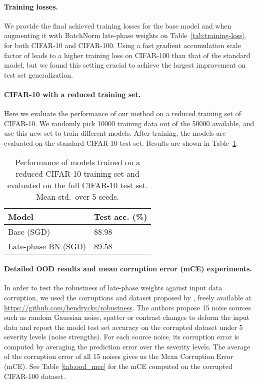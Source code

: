 \documentclass{article} \usepackage{iclr2021_conference,times}
\begin{document}
\paragraph{Training losses.} We provide the final achieved training losses for the base model and when augmenting it with BatchNorm late-phase weights on Table~\ref{tab:training-loss}, for both CIFAR-10 and CIFAR-100. Using a fast gradient accumulation scale factor of  leads to a higher training loss on CIFAR-100 than that of the standard model, but we found this setting crucial to achieve the largest improvement on test set generalization.



\paragraph{CIFAR-10 with a reduced training set.} Here we evaluate the performance of our method on a reduced training set of CIFAR-10. We randomly pick 10000 training data out of the 50000 available, and use this new set to train different models. After training, the models are evaluated on the standard CIFAR-10 test set. Results are shown in Table~\ref{tab:reduced-c10}. 


\begin{table}
\centering
\caption{Performance of models trained on a reduced CIFAR-10 training set and evaluated on the full CIFAR-10 test set.  Mean  std.~over 5 seeds. \label{tab:reduced-c10}}
\vspace{-0.2cm}
\begin{tabular}{ll}
\toprule
Model & Test acc. (\%) \\\midrule
Base (SGD)      &    88.98  \\
Late-phase BN (SGD)   & 89.58 \\\bottomrule  
\end{tabular}
\end{table}

\paragraph{Detailed OOD results and mean corruption error (mCE) experiments.}
In order to test the robustness of late-phase weights against input data corruption, we used the  corruptions and dataset proposed by \citet{hendrycks_benchmarking_2019}, freely available at \url{https://github.com/hendrycks/robustness}. The authors propose 15 noise sources such as random Gaussian noise, spatter or contrast changes to deform the input data and report the model test set accuracy on the corrupted dataset under 5 severity levels (noise strengths). For each source noise, its corruption error is computed by averaging the prediction error over the severity levels. The average of the corruption error of all 15 noises gives us the Mean Corruption Error (mCE). See Table \ref{tab:ood_mce} for the mCE computed on the corrupted CIFAR-100 dataset.
\end{document}
